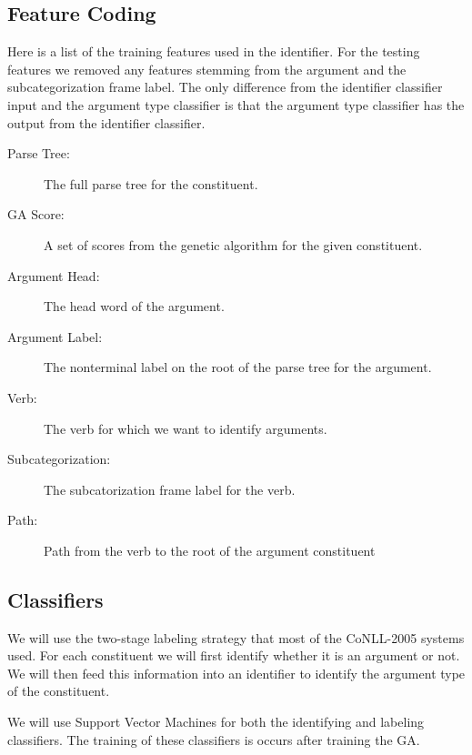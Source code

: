 \documentclass{article}
\begin{document}
\subsection{Feature Coding}
Here is a list of the training features used in the identifier.  For the 
testing features we removed any features stemming from the argument and 
the subcategorization frame label.  The only difference from the identifier
classifier input and the argument type classifier is that the argument type
classifier has the output from the identifier classifier.

\begin{description}
\item[Parse Tree:] The full parse tree for the constituent.
\item[GA Score:] A set of scores from the genetic algorithm for the given
                 constituent.
\item[Argument Head:] The head word of the argument.
\item[Argument Label:] The nonterminal label on the root of the parse tree
                       for the argument.
\item[Verb:] The verb for which we want to identify arguments.
\item[Subcategorization:] The subcatorization frame label for the verb.
\item[Path:] Path from the verb to the root of the argument constituent
\end{description}

\subsection{Classifiers}
We will use the two-stage labeling strategy that most of the CoNLL-2005 
systems used.  For each constituent we will first identify whether it is
an argument or not.  We will then feed this information into an identifier
to identify the argument type of the constituent.

We will use Support Vector Machines for both the identifying and labeling
classifiers.  The training of these classifiers is occurs after training
the GA.
\end{document}
